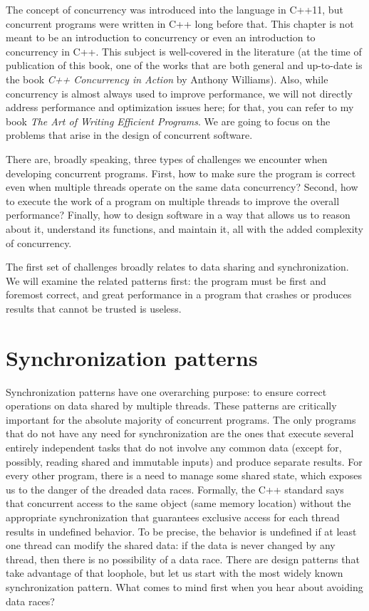 The concept of concurrency was introduced into the language in C++11, but concurrent programs were written in C++ long before that. This chapter is not meant to be an introduction to concurrency or even an introduction to concurrency in C++. This subject is well-covered in the literature (at the time of publication of this book, one of the works that are both general and up-to-date is the book \emph{C++ Concurrency in Action} by Anthony Williams). Also, while concurrency is almost always used to improve performance, we will not directly address performance and optimization issues here; for that, you can refer to my book \emph{The Art of Writing Efficient Programs}. We are going to focus on the problems that arise in the design of concurrent software.

There are, broadly speaking, three types of challenges we encounter when developing concurrent programs. First, how to make sure the program is correct even when multiple threads operate on the same data concurrency? Second, how to execute the work of a program on multiple threads to improve the overall performance? Finally, how to design software in a way that allows us to reason about it, understand its functions, and maintain it, all with the added complexity of concurrency.

The first set of challenges broadly relates to data sharing and synchronization. We will examine the related patterns first: the program must be first and foremost correct, and great performance in a program that crashes or produces results that cannot be trusted is useless.

\section{Synchronization patterns}

Synchronization patterns have one overarching purpose: to ensure correct operations on data shared by multiple threads. These patterns are critically important for the absolute majority of concurrent programs. The only programs that do not have any need for synchronization are the ones that execute several entirely independent tasks that do not involve any common data (except for, possibly, reading shared and immutable inputs) and produce separate results. For every other program, there is a need to manage some shared state, which exposes us to the danger of the dreaded data races. Formally, the C++ standard says that concurrent access to the same object (same memory location) without the appropriate synchronization that guarantees exclusive access for each thread results in undefined behavior. To be precise, the behavior is undefined if at least one thread can modify the shared data: if the data is never changed by any thread, then there is no possibility of a data race. There are design patterns that take advantage of that loophole, but let us start with the most widely known synchronization pattern. What comes to mind first when you hear about avoiding data races?

